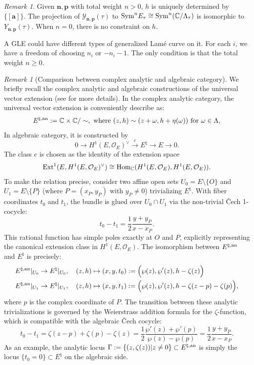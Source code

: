 \documentclass[11pt]{amsart}
\theoremstyle{remark}
\newtheorem{remark}[theorem]{Remark}
\numberwithin{equation}{section}
\newcommand{\Sym}{{\rm Sym}}
\begin{document}
\begin{remark}
Given $\mathbf{n},\mathbf{p}$ with total weight $n>0$, $h$ is uniquely determined by $\{[\mathbf{a}]\}$. The projection of $\mathcal{Y}_{\mathbf{n},\mathbf{p}}(\tau)$ to $\Sym^n E_\tau \cong \Sym^n(\mathbb{C} / \Lambda_\tau)$ is isomorphic to $Y_{\mathbf{n},\mathbf{p}}(\tau)$. 
When $n=0$, there is no constraint on $h$. 

A GLE could have different types of generalized Lam\'e curve on it. For each $i$, we have a freedom of choosing $n_i$ or $-n_i-1$. The only condition is that the total weight $n \geq 0$.
\end{remark}
\begin{remark}[Comparison between complex analytic and algebraic category]
We briefly recall the complex analytic and algebraic constructions of the universal vector extension (see \cite[Examples~2.1 and 2.2]{Fonseca_Mattes_2025} for more details). 
In the complex analytic category, the universal vector extension is conveniently describe as:
\[
    E^{\natural, {\rm an}} := \mathbb{C} \times \mathbb{C} / \sim, \text{ where } (z,h) \sim (z+\omega, h+\eta(\omega)) \text{ for }\omega \in \Lambda, 
\]
In algebraic category, it is constructed by 
\[
    0 \rightarrow H^1(E, \mathcal{O}_E)^{\vee} \xrightarrow{e} E^{\natural} \rightarrow E \rightarrow 0. 
\]
The class $e$ is chosen as the identity of the extension space
\[
    {\rm Ext}^1(E, H^1(E, \mathcal{O}_E)^{\vee}  ) \cong {\rm Hom}_{\mathbb{C}} ( H^1(E, \mathcal{O}_E), H^1(E, \mathcal{O}_E)  ). 
\]
To make the relation precise, consider two affine open sets $U_0 = E \setminus \{O\}$ and $U_1 = E \setminus \{P\}$ (where $P=(x_P,y_P)$ with $y_P \neq 0$) trivializing $E^{\natural}$. With fiber coordinates $t_0$ and $t_1$, the bundle is glued over $U_0 \cap U_1$ via the non-trivial \v{C}ech 1-cocycle:
\[
    t_0 - t_1 = \frac{1}{2} \frac{y + y_P}{x - x_P}.
\]
This rational function has simple poles exactly at $O$ and $P$, explicitly representing the canonical extension class in $H^1(E, \mathcal{O}_E)$. The isomorphism between $E^{\natural,{\rm an}}$ and $E^{\natural}$ is precisely:
\[
\begin{split}
    E^{\natural, {\rm an}}|_{U_0} &\rightarrow E^{\natural}|_{U_0}, \quad (z, h) \mapsto (x, y, t_0) := \Big( \wp(z), \wp'(z), h - \zeta(z) \Big)
    \\
    E^{\natural, {\rm an}}|_{U_1} &\rightarrow E^{\natural}|_{U_1}, \quad (z, h) \mapsto (x, y, t_1) := \Big( \wp(z), \wp'(z), h - \zeta(z-p) - \zeta(p) \Big),
\end{split}
\]
where $p$ is the complex coordinate of $P$. The transition between these analytic trivializations is governed by the Weierstrass addition formula for the $\zeta$-function, which is compatible with the algebraic \v{C}ech cocycle:
\[
    t_0 - t_1 = \zeta(z-p) + \zeta(p) - \zeta(z) = \frac{1}{2} \frac{\wp'(z) + \wp'(p)}{\wp(z) - \wp(p)} = \frac{1}{2} \frac{y + y_P}{x - x_P}.
\]
As an example, the analytic locus $\Gamma:=\{ (z, \zeta(z))| z \neq 0  \} \subset E^{\natural,{\rm an}}$ is simply the locus $\{t_0=0\} \subset E^{\natural} $ on the algebraic side.
\end{remark}
\end{document}
